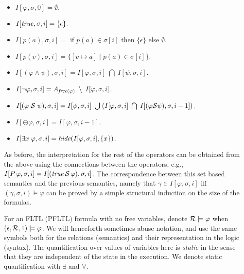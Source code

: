 \begin{itemize}
\item $I [ \varphi , \sigma , 0 ] = \emptyset$.
\item $I [ \mathit{true} , \sigma , i ] = \{ \epsilon \}$.
\item $I [ p ( a ) , \sigma , i ] =$ if $p ( a ) \in \sigma [ i ]$ then
$\{ \epsilon \}$ else $\emptyset$.
\item $I [ p ( v ) , \sigma , i ] = \{ [ v \mapsto a ] \; | \; p ( a ) \in
\sigma [ i ] \}$.
\item $I [ ( \varphi \wedge \psi ) , \sigma , i ] = 
I [ \varphi , \sigma , i ] \;  \bigcap \; I [ \psi , \sigma , i ]$.
\item $I [ \neg \varphi , \sigma , i ] = 
A_{\mathit{free} ( \varphi )} \; \setminus \; I [ \varphi , \sigma , i ]$.
\item $I [ ( \varphi \; {\cal S} \; \psi ) , \sigma , i ] = 
I [ \psi , \sigma , i ] \; \bigcup \;
( I [ \varphi , \sigma , i ] \; \bigcap \; 
I [ (\varphi {\cal S} \psi ) , \sigma , i - 1 ] )$.
\item $I [ \ominus \varphi , \sigma , i ] = I [ \varphi , \sigma , i-1 ]$.
\item $I [ \exists x \; \varphi , \sigma , i ] = 
\mathit{hide} ( I [ \varphi , \sigma , i ] , \{ x \} )$.
\end{itemize}

\noindent
As before, the interpretation for the rest of the operators can
be obtained from the above using the connections between the operators,
e.g., $I [ P \, \varphi  , \sigma , i ] = 
I [ ( \mathit{true} \, {\cal S} \, \varphi ) , \sigma , i ]$.
The correspondence between this set based semantics 
and the previous semantics, namely that
$\gamma \in I [ \varphi , \sigma, i ]$ iff
$( \gamma , \sigma , i ) \models \varphi$
can be proved by a simple structural induction on
the size of the formulas.
 \fi

For an FLTL (PFLTL) formula with no free variables, denote ${\cal R} \models \varphi$ when $( \epsilon , {\cal R} , 1 ) \models \varphi$.
We will henceforth sometimes abuse notation, and use the same
symbols both for the relations (semantics) and their representation in
the logic (syntax).
The quantification over values of variables here is {\em static} in the sense that they are independent of the state in the execution. We
denote static quantification with $\exists$ and
$\forall$.



